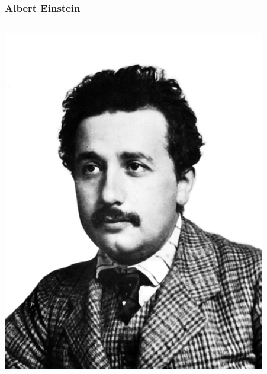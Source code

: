 \documentclass[14pt]{beamer}
\begin{document}
\begin{frame}
	\frametitle{Albert Einstein}
	\begin{center}
		\begin{columns}
			\begin{column}{0.5\textwidth}
		\includegraphics[width=0.9\textwidth]{albert_einstein.jpg}
			\end{column}
			\begin{column}{0.5\textwidth}
			\end{column}
		\end{columns}
		\vspace*{1em}
	\end{center}
\end{frame}
\end{document}

